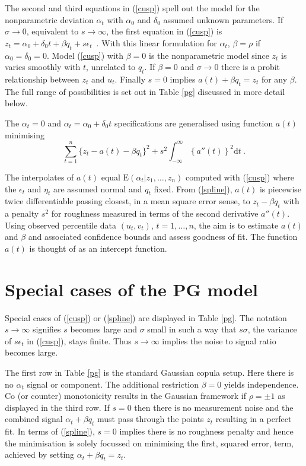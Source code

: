 \documentclass[authoryear]{elsarticle}
\newcommand{\E}{\mathrm{E}}
\newcommand{\eps}{\epsilon}
\newcommand{\de}{\mathrm{d}}
\newcommand{\eref}[1]{(\ref{#1})}
\newcommand{\tref}[1]{Table \ref{#1}}
\newcommand{\be}[1]{\begin{equation}\label{#1}}
\newcommand{\ee}{\end{equation}}
\begin{document}
The second and third equations in \eref{cusp} spell out the model for the nonparametric deviation  $\alpha_t$  with $\alpha_0$ and $\delta_0$ assumed unknown parameters.  If $\sigma\rightarrow 0$, equivalent to $s\rightarrow\infty$,  the first equation in \eref{cusp} is
$
z_t = \alpha_0+\delta_0 t + \beta q_t + s\eps_t
$\ .
With this linear formulation for $\alpha_t$,  $\beta=\rho$ if $\alpha_0=\delta_0=0$.    Model \eref{cusp} with  $\beta=0$ is the  nonparametric model since $z_t$ is varies smoothly with $t$, unrelated to $q_t$.  If $\beta=0$ and $\sigma\rightarrow 0$ there is a probit relationship between $z_t$ and $u_t$.  Finally $s=0$ implies $a(t)+\beta q_t=z_t$ for any $\beta$.   The full range of possibilities is set out in \tref{pg} discussed in more detail below.

The $\alpha_t=0$ and $\alpha_t=\alpha_0+\delta_0 t$ specifications are generalised using function $a(t)$ minimising
\be{spline}
 \sum_{t=1}^n\{z_t-a(t)-\beta q_t\}^2 + s^2\int_{-\infty}^{\infty} \left\{a''(t)\right\}^2\de t\ .
\ee

The interpolates of  $a(t)$ equal $\E(\alpha_t|z_1,\ldots,z_n)$ computed with \eref{cusp} where the $\eps_t$ and $\eta_t$ are assumed normal and $q_t$ fixed.
From \eref{spline},  $a(t)$ is piecewise twice differentiable passing closest, in a mean square error sense, to $z_t-\beta q_t$  with a penalty $s^2$ for  roughness measured in terms of the second derivative $a''(t)$.  Using observed percentile data $(u_t,v_t)$, $t=1,\ldots,n$, the aim is to estimate $a(t)$ and $\beta$ and associated confidence bounds and assess goodness of fit.   The function $a(t)$ is thought of as an intercept function.

\section{Special cases of the PG model}  

Special cases of  \eref{cusp} or \eref{spline} are displayed in \tref{pg}.   The notation $s\rightarrow\infty$ signifies $s$ becomes large and $\sigma$ small in such a way that $s\sigma$, the variance of $s\eps_t$ in \eref{cusp},  stays finite.    Thus $s\rightarrow\infty$  implies the noise to signal ratio becomes large. 



The first row in \tref{pg} is the standard Gaussian copula setup.  Here there is no $\alpha_t$ signal or component.  The additional restriction $\beta=0$ yields independence.  Co (or counter) monotonicity results in the Gaussian framework if $\rho=\pm 1$ as displayed in the third row.
If $s= 0$ then there is no measurement noise and the combined signal $\alpha_t+\beta q_t$ must pass through the points $z_t$ resulting in a perfect fit.   In terms of \eref{spline}, $s=0$ implies there is no roughness penalty and hence the minimisation is solely focussed on minimising the first, squared error, term, achieved  by setting $\alpha_t+\beta q_t=z_t$. 
 
\end{document}
